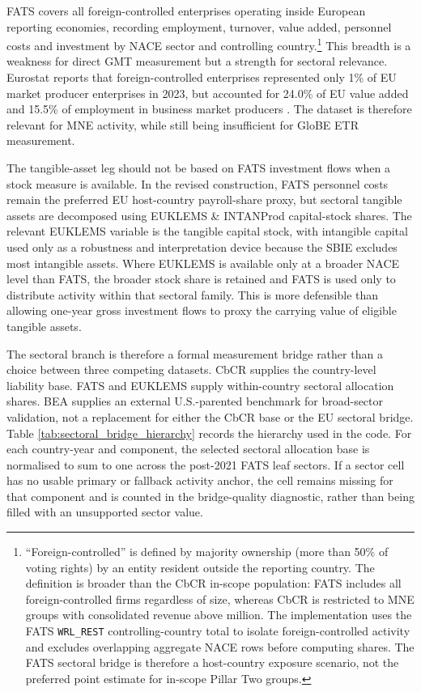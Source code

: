 \documentclass[11pt,a4paper]{article}
\newcommand{\EUR}{\texteuro}
\newcommand{\code}[1]{\texttt{#1}}
\begin{document}
FATS covers all foreign-controlled enterprises operating inside European reporting economies, recording employment, turnover, value added, personnel costs and investment by NACE sector and controlling country.\footnote{``Foreign-controlled'' is defined by majority ownership (more than 50\% of voting rights) by an entity resident outside the reporting country. The definition is broader than the CbCR in-scope population: FATS includes all foreign-controlled firms regardless of size, whereas CbCR is restricted to MNE groups with consolidated revenue above \EUR750 million. The implementation uses the FATS \code{WRL\_REST} controlling-country total to isolate foreign-controlled activity and excludes overlapping aggregate NACE rows before computing shares. The FATS sectoral bridge is therefore a host-country exposure scenario, not the preferred point estimate for in-scope Pillar Two groups.} This breadth is a weakness for direct GMT measurement but a strength for sectoral relevance. Eurostat reports that foreign-controlled enterprises represented only 1\% of EU market producer enterprises in 2023, but accounted for 24.0\% of EU value added and 15.5\% of employment in business market producers \citep{eurostat2025fats}. The dataset is therefore relevant for MNE activity, while still being insufficient for GloBE ETR measurement.

The tangible-asset leg should not be based on FATS investment flows when a stock measure is available. In the revised construction, FATS personnel costs remain the preferred EU host-country payroll-share proxy, but sectoral tangible assets are decomposed using EUKLEMS \& INTANProd capital-stock shares. The relevant EUKLEMS variable is the tangible capital stock, with intangible capital used only as a robustness and interpretation device because the SBIE excludes most intangible assets. Where EUKLEMS is available only at a broader NACE level than FATS, the broader stock share is retained and FATS is used only to distribute activity within that sectoral family. This is more defensible than allowing one-year gross investment flows to proxy the carrying value of eligible tangible assets.

The sectoral branch is therefore a formal measurement bridge rather than a choice between three competing datasets. CbCR supplies the country-level liability base. FATS and EUKLEMS supply within-country sectoral allocation shares. BEA supplies an external U.S.-parented benchmark for broad-sector validation, not a replacement for either the CbCR base or the EU sectoral bridge. Table \ref{tab:sectoral_bridge_hierarchy} records the hierarchy used in the code. For each country-year and component, the selected sectoral allocation base is normalised to sum to one across the post-2021 FATS leaf sectors. If a sector cell has no usable primary or fallback activity anchor, the cell remains missing for that component and is counted in the bridge-quality diagnostic, rather than being filled with an unsupported sector value.
\end{document}
